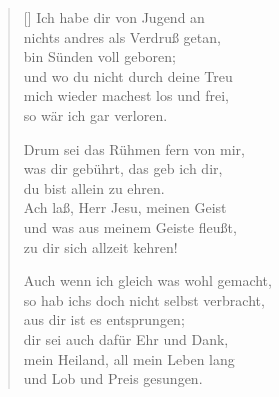 \begin{multicols}{2}
\begin{verse}[\versewidth]
 Ich habe dir von Jugend an\\
nichts andres als Verdruß getan,\\
bin Sünden voll geboren;\\
und wo du nicht durch deine Treu\\
mich wieder machest los und frei,\\
so wär ich gar verloren.

 Drum sei das Rühmen fern von mir,\\
was dir gebührt, das geb ich dir,\\
du bist allein zu ehren.\\
Ach laß, Herr Jesu, meinen Geist\\
und was aus meinem Geiste fleußt,\\
zu dir sich allzeit kehren!

 Auch wenn ich gleich was wohl gemacht,\\
so hab ichs doch nicht selbst verbracht,\\
aus dir ist es entsprungen;\\
dir sei auch dafür Ehr und Dank,\\
mein Heiland, all mein Leben lang\\
und Lob und Preis gesungen.

\end{verse}
\end{multicols}
